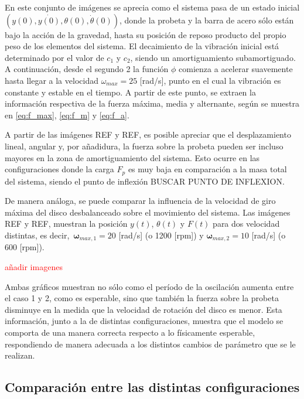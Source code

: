 En este conjunto de imágenes se aprecia como el sistema pasa de un estado inicial $(y(0), \dot{y(0)}, \theta(0), \dot{\theta}(0))$, donde la probeta y la barra de acero sólo están bajo la acción de la gravedad, hasta su posición de reposo producto del propio peso de los elementos del sistema. El decaimiento de la vibración inicial está determinado por el valor de $c_1$ y $c_2$, siendo un amortiguamiento subamortiguado. A continuación, desde el segundo 2 la función $\phi$ comienza a acelerar suavemente hasta llegar a la velocidad $\omega_{max} = 25$ [rad/s], punto en el cual la vibración es constante y estable en el tiempo. A partir de este punto, se extraen la información respectiva de la fuerza máxima, media y alternante, según se muestra en \ref{eq:f_max}, \ref{eq:f_m} y \ref{eq:f_a}. 

A partir de las imágenes REF y REF, es posible apreciar que el desplazamiento lineal, angular y, por añadidura, la fuerza sobre la probeta pueden ser incluso mayores en la zona de amortiguamiento del sistema. Esto ocurre en las configuraciones donde la carga $F_p$ es muy baja en comparación a la masa total del sistema, siendo el punto de inflexión BUSCAR PUNTO DE INFLEXION. 

De manera análoga, se puede comparar la influencia de la velocidad de giro máxima del disco desbalanceado sobre el movimiento del sistema. Las imágenes REF y REF, muestran la posición $y(t)$, $\theta(t)$ y $F(t)$ para dos velocidad distintas, es decir, $\,\mathbf{\omega}_{max,1} = 20$ [rad/s] (o 1200 [rpm]) y $\mathbf{\omega}_{max,2} = 10$ [rad/s] (o 600 [rpm]).

\textcolor{red}{añadir imagenes}

Ambas gráficos muestran no sólo como el período de la oscilación aumenta entre el caso 1 y 2, como es esperable, sino que también la fuerza sobre la probeta disminuye en la medida que la velocidad de rotación del disco es menor. Esta información, junto a la de distintas configuraciones, muestra que el modelo se comporta de una manera correcta respecto a lo físicamente esperable, respondiendo de manera adecuada a los distintos cambios de parámetro que se le realizan.

\subsection{Comparación entre las distintas configuraciones} 


